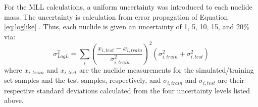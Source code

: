 For the \gls{MLL} calculations, a uniform uncertainty was introduced to each
nuclide mass.  The uncertainty is calculation from error propagation of
Equation \ref{eq:loglike} \cite{mll_method, mll_sensitivity}.  Thus, each
nuclide is given an uncertainty of 1, 5, 10, 15, and 20\% via:
\begin{equation}
  \sigma_{Log L}^2 = \sum_i \left( 
                            \frac{x_{i,test} - x_{i,train}}{\sigma_{i,train}^2}
                            \right)^2 
                            (\sigma_{i,train}^2 + \sigma_{i,test}^2)
  \label{eq:mllunc}
\end{equation}
where $x_{i,train}$ and $x_{i,test}$ are the nuclide measurements for the
simulated/training set samples and the test samples, respectively, and
$\sigma_{i,train}$ and $\sigma_{i,test}$ are their respective standard
deviations calculated from the four uncertainty levels listed above.  
